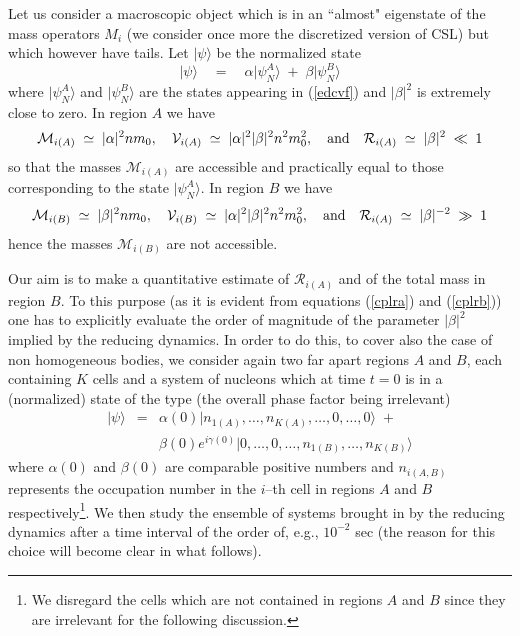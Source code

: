 \documentclass[10pt,a4paper]{article}
\begin{document}
Let us consider a macroscopic object which is in an ``almost"
eigenstate of the mass operators $M_{i}$ (we consider once more
the discretized version of CSL) but which however have tails. Let
$|\psi\rangle$ be the normalized state
\begin{equation}
|\psi\rangle \quad  = \quad \alpha |\psi^{A}_{N}\rangle \; + \;
\beta |\psi^{B}_{N}\rangle
\end{equation}
where $|\psi^{A}_{N}\rangle$ and $|\psi^{B}_{N}\rangle$ are the
states appearing in (\ref{edcvf}) and $|\beta|^{2}$ is extremely
close to zero. In region $A$ we have
\begin{equation} \label{cplra}
{\mathcal M}_{i(A)} \; \simeq \; |\alpha|^{2}nm_{0}, \quad
{\mathcal V}_{i(A)} \; \simeq \; |\alpha|^{2}|\beta|^{2} n^{2}
m_{0}^{2}, \quad \makebox{and} \quad {\mathcal R}_{i(A)} \; \simeq
\; |\beta|^{2} \; \ll \; 1
\end{equation}
so that the masses ${\mathcal M}_{i(A)}$ are accessible and
practically equal to those corresponding to the state
$|\psi^{A}_{N}\rangle$. In region $B$ we have
\begin{equation} \label{cplrb}
{\mathcal M}_{i(B)} \; \simeq \; |\beta|^{2}nm_{0}, \quad
{\mathcal V}_{i(B)} \; \simeq \; |\alpha|^{2}|\beta|^{2} n^{2}
m_{0}^{2}, \quad \makebox{and} \quad {\mathcal R}_{i(A)} \; \simeq
\; |\beta|^{-2} \; \gg \; 1
\end{equation}
hence the masses ${\mathcal M}_{i(B)}$ are not accessible.

Our aim is to make a quantitative estimate of ${\mathcal
R}_{i(A)}$ and of the total mass in region $B$. To this purpose
(as it is evident from equations (\ref{cplra}) and (\ref{cplrb})) one
has to explicitly evaluate the order of magnitude of the parameter
$|\beta|^{2}$ implied by the  reducing dynamics. In order to do
this, to cover also the case of non homogeneous bodies, we
consider again two far apart regions $A$ and $B$, each containing
$K$ cells and a system of nucleons which at time $t=0$ is in a
(normalized) state of the type (the overall phase factor being
irrelevant)
\begin{eqnarray} \label{tps}
|\psi\rangle & = & \alpha(0)|n_{1(A)}, \ldots, n_{K(A)},
\ldots, 0, \ldots, 0\rangle \; + \nonumber \\
& & \beta(0) e^{i\gamma(0)} |0, \ldots, 0, \ldots, n_{1(B)},
\ldots, n_{K(B)} \rangle
\end{eqnarray}
where $\alpha(0)$ and $\beta(0)$ are comparable positive numbers
and $n_{i(A,B)}$  represents the occupation number in the $i$--th
cell in regions $A$ and $B$ respectively\footnote{We disregard the
cells which are not contained in regions $A$ and $B$ since they
are irrelevant for the following discussion.}. We then study the
ensemble of systems brought in by the reducing dynamics after a
time interval of the order of, e.g., $10^{-2}$ sec (the reason for
this choice will become clear in what follows).
\end{document}
